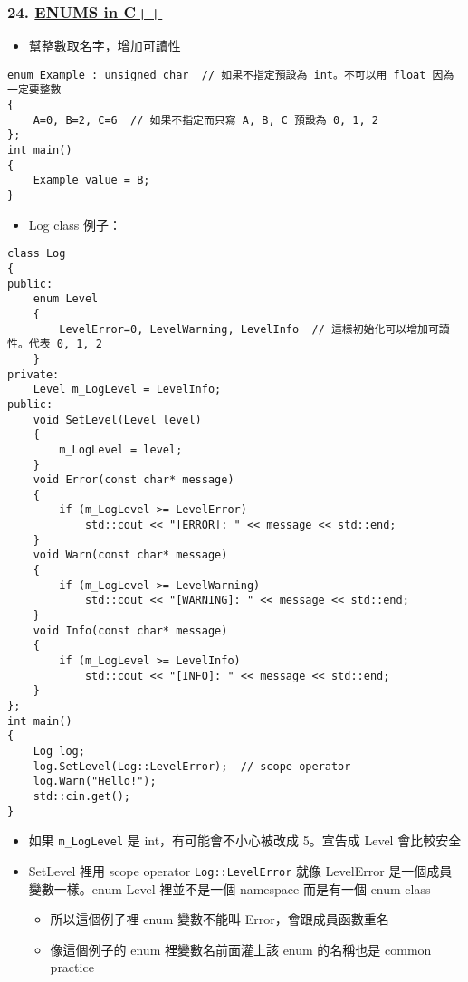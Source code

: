 \documentclass[11pt]{article}
\providecommand{\tightlist}{%
      \setlength{\itemsep}{0pt}\setlength{\parskip}{0pt}}
\begin{document}
\hypertarget{enums-in-c}{%
\subsubsection{\texorpdfstring{24.
\href{https://www.youtube.com/watch?v=x55jfOd5PEE\&list=PLlrATfBNZ98dudnM48yfGUldqGD0S4FFb\&index=25\&t=0s}{ENUMS
in C++}}{24. ENUMS in C++}}\label{enums-in-c}}

\begin{itemize}
\tightlist
\item
  幫整數取名字，增加可讀性
\end{itemize}

\begin{verbatim}
enum Example : unsigned char  // 如果不指定預設為 int。不可以用 float 因為一定要整數
{
    A=0, B=2, C=6  // 如果不指定而只寫 A, B, C 預設為 0, 1, 2
};
int main()
{
    Example value = B;
}
\end{verbatim}

\begin{itemize}
\tightlist
\item
  Log class 例子：
\end{itemize}

\begin{verbatim}
class Log
{
public:
    enum Level
    {
        LevelError=0, LevelWarning, LevelInfo  // 這樣初始化可以增加可讀性。代表 0, 1, 2
    }
private: 
    Level m_LogLevel = LevelInfo;
public: 
    void SetLevel(Level level)
    {
        m_LogLevel = level;
    }
    void Error(const char* message)
    {
        if (m_LogLevel >= LevelError)
            std::cout << "[ERROR]: " << message << std::end;
    }
    void Warn(const char* message)
    {
        if (m_LogLevel >= LevelWarning)
            std::cout << "[WARNING]: " << message << std::end;
    }
    void Info(const char* message)
    {
        if (m_LogLevel >= LevelInfo)
            std::cout << "[INFO]: " << message << std::end;
    }
};
int main()
{
    Log log;
    log.SetLevel(Log::LevelError);  // scope operator
    log.Warn("Hello!");
    std::cin.get();
}
\end{verbatim}

\begin{itemize}
\tightlist
\item
  如果 \texttt{m\_LogLevel} 是 int，有可能會不小心被改成 5。宣告成 Level
  會比較安全
\item
  SetLevel 裡用 scope operator \texttt{Log::LevelError} 就像 LevelError
  是一個成員變數一樣。enum Level 裡並不是一個 namespace 而是有一個 enum
  class

  \begin{itemize}
  \tightlist
  \item
    所以這個例子裡 enum 變數不能叫 Error，會跟成員函數重名
  \item
    像這個例子的 enum 裡變數名前面灌上該 enum 的名稱也是 common practice
  \end{itemize}
\end{itemize}
\end{document}
